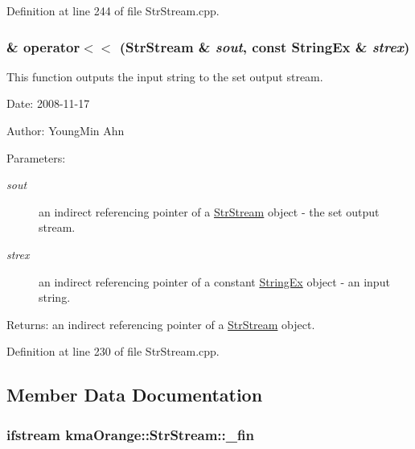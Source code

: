 Definition at line 244 of file StrStream.cpp.\hypertarget{classkmaOrange_1_1StrStream_410bc1a06275f285fbd7e5e77f5584a2}{
\subsubsection[{operator$<$$<$}]{\& operator$<$$<$ ({\bf StrStream} \& {\em sout}, \/  const {\bf StringEx} \& {\em strex})}}
\label{classkmaOrange_1_1StrStream_410bc1a06275f285fbd7e5e77f5584a2}


This function outputs the input string to the set output stream. 

\begin{Desc}
\item[Date:]2008-11-17 \end{Desc}
\begin{Desc}
\item[Author:]YoungMin Ahn \end{Desc}
\begin{Desc}
\item[Parameters:]
\begin{description}
\item[{\em sout}]an indirect referencing pointer of a \hyperlink{classkmaOrange_1_1StrStream}{StrStream} object - the set output stream. \item[{\em strex}]an indirect referencing pointer of a constant \hyperlink{classStringEx}{StringEx} object - an input string. \end{description}
\end{Desc}
\begin{Desc}
\item[Returns:]an indirect referencing pointer of a \hyperlink{classkmaOrange_1_1StrStream}{StrStream} object. \end{Desc}


Definition at line 230 of file StrStream.cpp.

\subsection{Member Data Documentation}
\hypertarget{classkmaOrange_1_1StrStream_a24688ba32500f2f906c7f89eca4e667}{
\subsubsection[{\_\-fin}]{\setlength{\rightskip}{0pt plus 5cm}ifstream {\bf kmaOrange::StrStream::\_\-fin}}}
\label{classkmaOrange_1_1StrStream_a24688ba32500f2f906c7f89eca4e667}


